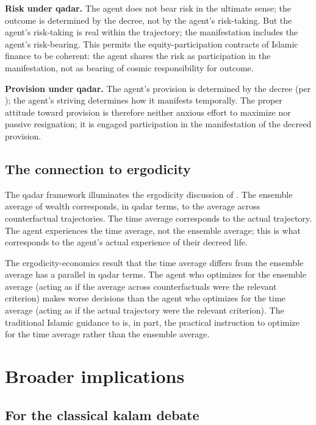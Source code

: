 \textbf{Risk under qadar.} The agent does not bear risk in the
ultimate sense; the outcome is determined by the decree, not by
the agent's risk-taking. But the agent's risk-taking is real
within the trajectory; the manifestation includes the agent's
risk-bearing. This permits the equity-participation contracts of
Islamic finance to be coherent: the agent shares the risk as
participation in the manifestation, not as bearing of cosmic
responsibility for outcome.

\textbf{Provision under qadar.} The agent's provision is determined
by the decree (per ); the agent's
striving determines how it manifests temporally. The proper
attitude toward provision is therefore neither anxious effort to
maximize nor passive resignation; it is engaged participation in
the manifestation of the decreed provision.

\subsection{The connection to ergodicity}

The qadar framework illuminates the ergodicity discussion of
. The ensemble average of wealth corresponds,
in qadar terms, to the average across counterfactual trajectories.
The time average corresponds to the actual trajectory. The
agent experiences the time average, not the ensemble average;
this is what corresponds to the agent's actual experience of
their decreed life.

The ergodicity-economics result that the time average differs
from the ensemble average has a parallel in qadar terms. The
agent who optimizes for the ensemble average (acting as if the
average across counterfactuals were the relevant criterion) makes
worse decisions than the agent who optimizes for the time average
(acting as if the actual trajectory were the relevant criterion).
The traditional Islamic guidance to  is, in part,
the practical instruction to optimize for the time average rather
than the ensemble average.

\section{Broader implications}
\label{sec:qad-implications}

\subsection{For the classical kalam debate}

